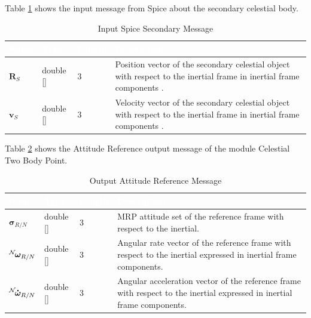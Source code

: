\documentclass[]{AVSSimReportMemo}
\begin{document}
Table \ref{tab:inputSecTable} shows the input message from Spice about the secondary celestial body.
\begin{table}[h!]
	\centering
	\caption{Input Spice Secondary Message}
	\begin{tabular}{|l|l|l|p{3in}|}
		\hline
		\rowcolor{BrickRed}
		\textcolor{white}{Name} & \textcolor{white}{Type} & 
		\textcolor{white}{Length} & 
		\textcolor{white}{Description}  \\ \hline
		$\bm{R}_S$  & double [] & 3 & 
		Position vector of the secondary celestial object with respect to the inertial frame in inertial frame components . \\ \hline
		$\bm{v}_S$  & double [] & 3 & 
		Velocity vector of the secondary celestial object with respect to the inertial frame in inertial frame components . \\ \hline
	\end{tabular}
	\label{tab:inputSecTable}
\end{table}


Table \ref{tab:outputTable} shows the Attitude Reference output message of the module Celestial Two Body Point.
\begin{table}[h!]
	\centering
	\caption{Output Attitude Reference Message}
	\begin{tabular}{|l|l|l|p{3in}|}
		\hline
		\rowcolor{BrickRed}
		\textcolor{white}{Name} & \textcolor{white}{Type} & 
		\textcolor{white}{Length} & 
		\textcolor{white}{Description}  \\ \hline
		$\bm{\sigma}_{R/N}$ & double [] & 3 & 
		MRP attitude set of the reference frame with respect to the inertial. \\ \hline
		$\leftexp{N} {\bm{\omega}_{R/N}}$ & double [] & 3 & 
		Angular rate vector of the reference frame with respect to the inertial expressed in inertial frame components. \\ \hline
		$\leftexp{N} {\bm{\dot{\omega}}_{R/N}}$ & double [] & 3 & 
		Angular acceleration vector of the reference frame with respect to the inertial expressed in inertial frame components. \\ \hline
	\end{tabular}
	\label{tab:outputTable}
\end{table}
\newpage
\end{document}
